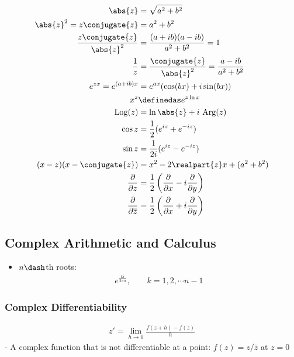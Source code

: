 \begin{align*}
\abs{z} &= \sqrt{a^2 + b^2} \\
\abs{z}^2 = z\conjugate{z} &= a^2 + b^2 \\
\frac{z\conjugate{z}}{\abs{z}^2} &= \frac{(a+ib)(a-ib)}{a^2 + b^2} = 1 \\
\frac{1}{z} &= \frac{\conjugate{z}}{\abs{z}^2} = \frac{a-ib}{a^2+b^2}
\\
e^{zx} = e^{(a+ib)x} &= e^{ax}(\cos(bx) + i\sin(bx)) \\
x^z &\definedas e^{z\ln x} \\
\mathrm{Log}(z) &= \ln\abs{z} + i~\mathrm{Arg}(z) \\
\cos z &= \frac{1}{2}(e^{iz} + e^{-iz}) \\
\sin z &= \frac{1}{2i}(e^{iz} - e^{-iz}) \\
(x-z)(x-\conjugate{z}) &= x^2 - 2\realpart{z}x + (a^2+b^2)
\\
\frac { \partial } { \partial z } &= \frac { 1 } { 2 } \left( \frac { \partial } { \partial x } - i \frac { \partial } { \partial y } \right)
\\
\frac { \partial } { \partial \overline { z } } &= \frac { 1 } { 2 } \left( \frac { \partial } { \partial x } + i \frac { \partial } { \partial y } \right)
\end{align*}

\hypertarget{complex-arithmetic-and-calculus}{%
\subsection{Complex Arithmetic and
Calculus}\label{complex-arithmetic-and-calculus}}

\begin{itemize}
\tightlist
\item
  \(n\dash\)th roots:
  \begin{align*}e^{\frac{ki}{2\pi n}}, \qquad k = 1, 2, \cdots n-1\end{align*}
\end{itemize}

\hypertarget{complex-differentiability}{%
\subsubsection{Complex
Differentiability}\label{complex-differentiability}}

\begin{align*}
z' = \lim_{h\to 0} \frac{f(z+h)-f(z)}{h}
\end{align*} - A complex function that is not differentiable at a point:
\(f(z) = z/\bar{z}\) at \(z=0\)


